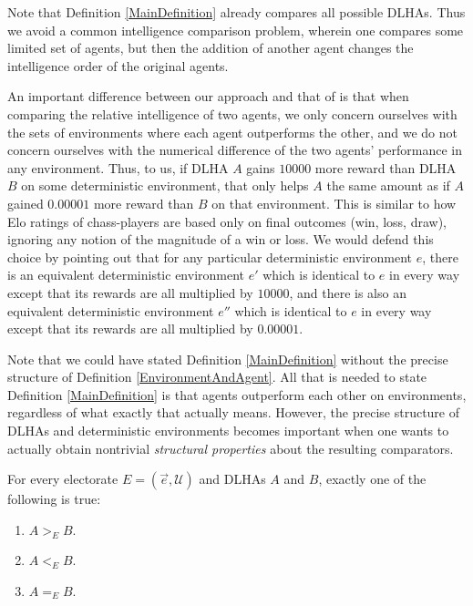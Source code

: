 \documentclass[twoside,11pt]{article}
\begin{document}
Note that Definition \ref{MainDefinition} already compares all possible DLHAs.
Thus we avoid a common intelligence comparison problem, wherein one compares some
limited set of agents, but then the addition of another agent changes the
intelligence order of the original agents.

An important difference between our approach and that of \citet{hutter2007}
is that when comparing the relative intelligence of two agents, we only concern ourselves
with the sets of environments where each agent outperforms the other, and we do not
concern ourselves with the numerical difference of the two agents' performance in any
environment. Thus, to us, if DLHA $A$ gains $10000$ more reward than DLHA $B$ on some
deterministic environment, that only helps $A$ the same amount as
if $A$ gained $0.00001$ more reward
than $B$ on that environment.
This is similar to how Elo ratings of chass-players
are based only on final outcomes (win, loss, draw),
ignoring any notion of the magnitude of a win or loss.
We would defend this choice by pointing out that for any
particular deterministic environment $e$, there is an
equivalent deterministic environment $e'$ which is identical to
$e$ in every way except that its rewards are all multiplied by $10000$, and there is also
an equivalent deterministic environment $e''$ which is
identical to $e$ in every way except that its
rewards are all multiplied by $0.00001$.

Note that we could have stated Definition \ref{MainDefinition} without the
precise structure of Definition \ref{EnvironmentAndAgent}.
All that is needed to state Definition \ref{MainDefinition} is that agents
outperform each other on environments, regardless of what exactly that actually means.
However, the precise structure of DLHAs and deterministic environments becomes
important when one
wants to actually obtain nontrivial \emph{structural properties} about the resulting
comparators.

\begin{lemma}
\label{firsteasylemma}
    For every electorate $E=(\vec{e},\mathscr U)$ and DLHAs $A$ and $B$, exactly one of the following is true:
    \begin{enumerate}
        \item $A>_{E}B$.
        \item $A<_{E}B$.
        \item $A=_{E}B$.
    \end{enumerate}
\end{lemma}
\end{document}
